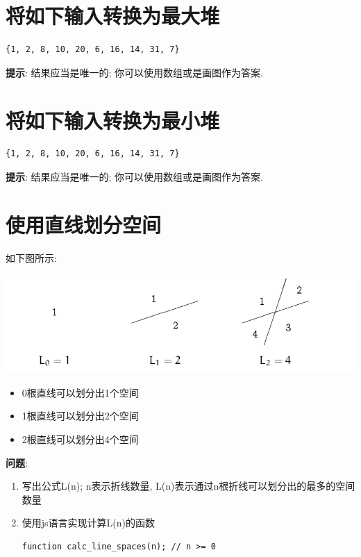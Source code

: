 \documentclass[11pt]{article}
\begin{document}
\section{将如下输入转换为最大堆}
\label{sec:org0c348ce}

\begin{verbatim}
{1, 2, 8, 10, 20, 6, 16, 14, 31, 7}
\end{verbatim}

\textbf{提示}:  结果应当是唯一的; 你可以使用数组或是画图作为答案.

\section{将如下输入转换为最小堆}
\label{sec:org39af9ca}

\begin{verbatim}
{1, 2, 8, 10, 20, 6, 16, 14, 31, 7}
\end{verbatim}

\textbf{提示}:  结果应当是唯一的; 你可以使用数组或是画图作为答案.
\section{使用直线划分空间}
\label{sec:orgba43e2d}

如下图所示:

\begin{center}
\includegraphics[width=.9\linewidth]{img/line.png}
\end{center}

\begin{itemize}
\item 0根直线可以划分出1个空间
\item 1根直线可以划分出2个空间
\item 2根直线可以划分出4个空间
\end{itemize}

\textbf{问题}:

\begin{enumerate}
\item 写出公式L(n); n表示折线数量, L(n)表示通过n根折线可以划分出的最多的空间数量
\item 使用js语言实现计算L(n)的函数
\begin{verbatim}
function calc_line_spaces(n); // n >= 0
\end{verbatim}
\end{enumerate}
\end{document}
